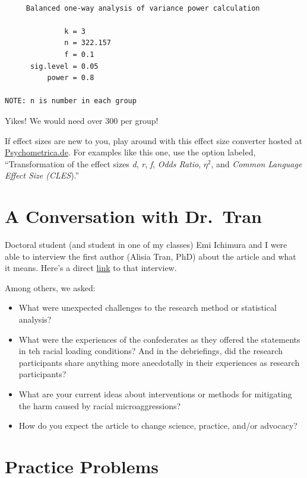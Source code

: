 \documentclass[
  11pt,
]{book}
\providecommand{\tightlist}{%
  \setlength{\itemsep}{0pt}\setlength{\parskip}{0pt}}
\begin{document}
\begin{verbatim}

     Balanced one-way analysis of variance power calculation 

              k = 3
              n = 322.157
              f = 0.1
      sig.level = 0.05
          power = 0.8

NOTE: n is number in each group
\end{verbatim}

Yikes! We would need over 300 per group!

If effect sizes are new to you, play around with this effect size converter hosted at \href{https://www.psychometrica.de/effect_size.html}{Psychometrica.de}. For examples like this one, use the option labeled, ``Transformation of the effect sizes \emph{d}, \emph{r}, \emph{f}, \emph{Odds Ratio}, \(\eta^2\), and \emph{Common Language Effect Size (CLES}).''

\hypertarget{a-conversation-with-dr.-tran}{%
\section{A Conversation with Dr.~Tran}\label{a-conversation-with-dr.-tran}}

Doctoral student (and student in one of my classes) Emi Ichimura and I were able to interview the first author (Alisia Tran, PhD) about the article and what it means. Here's a direct \href{https://spu.hosted.panopto.com/Panopto/Pages/Viewer.aspx?id=643f8a1e-bb6d-4ceb-a860-aeba01522528}{link} to that interview.

Among others, we asked:

\begin{itemize}
\tightlist
\item
  What were unexpected challenges to the research method or statistical analysis?
\item
  What were the experiences of the confederates as they offered the statements in teh racial loading conditions? And in the debriefings, did the research participants share anything more anecdotally in their experiences as research participants?
\item
  What are your current ideas about interventions or methods for mitigating the harm caused by racial microaggressions?
\item
  How do you expect the article to change science, practice, and/or advocacy?
\end{itemize}

\hypertarget{practice-problems-5}{%
\section{Practice Problems}\label{practice-problems-5}}
\end{document}
